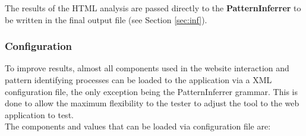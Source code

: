 The results of the HTML analysis are passed directly to the \textbf{PatternInferrer} to be written in the final output file (see Section \ref{sec:inf}).\\

\subsubsection{Configuration}\label{sec:conf}
To improve results, almost all components used in the website interaction and pattern identifying processes can be loaded to the application via a XML configuration file, the only exception being the PatternInferrer grammar. This is done to allow the maximum flexibility to the tester to adjust the tool to the web application to test.\\

The components and values that can be loaded via configuration file are: 
